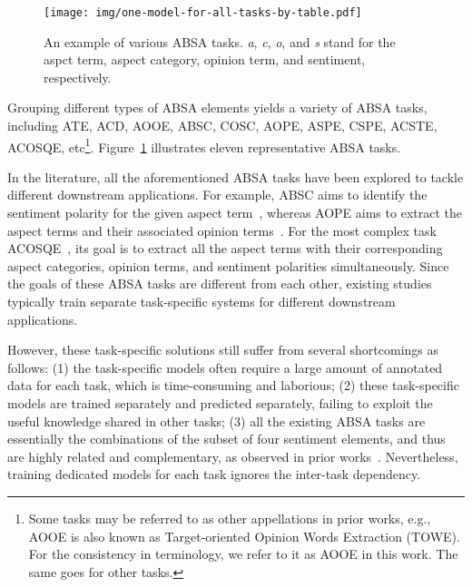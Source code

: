 \documentclass[11pt]{article}
\begin{document}
\begin{figure}[t]
\centering 
\texttt{[image: img/one-model-for-all-tasks-by-table.pdf]} 
\caption{An example of various ABSA tasks. \emph{a}, \emph{c}, \emph{o}, and \emph{s} stand for the aspct term, aspect category, opinion term, and sentiment, respectively.} 
\label{fig:various-absa-tasks-example}
\end{figure}


Grouping different types of ABSA elements yields a variety of ABSA tasks, including ATE, ACD, AOOE, ABSC, COSC, AOPE, ASPE, CSPE, ACSTE, ACOSQE, etc\footnote{Some tasks may be referred to as other appellations in prior works, e.g., AOOE is also known as Target-oriented Opinion Words Extraction (TOWE). For the consistency in terminology, we refer to it as AOOE in this work. The same goes for other tasks.}.
Figure~\ref{fig:various-absa-tasks-example} illustrates eleven representative ABSA tasks.

In the literature, all the aforementioned ABSA tasks have been explored to tackle different downstream applications.
For example, ABSC aims to identify the sentiment polarity for the given aspect term~\cite{tang2016effective}, whereas AOPE aims to extract the aspect terms and their associated opinion terms~\cite{chen-etal-2020-synchronous}.
For the most complex task ACOSQE~\cite{cai-etal-2021-acos}, its goal is to extract all the aspect terms with their corresponding aspect categories, opinion terms, and sentiment polarities simultaneously. 
Since the goals of these ABSA tasks are different from each other, existing studies typically train separate task-specific systems for different downstream applications.






However, these task-specific solutions still suffer from several shortcomings as follows: (1) the task-specific models often require a large amount of annotated data for each task, which is time-consuming and laborious; 
(2) these task-specific models are trained separately and predicted separately, failing to exploit the useful knowledge shared in other tasks; 
(3) all the existing ABSA tasks are essentially the combinations of the subset of four sentiment elements, and thus are highly related and complementary,
as observed in prior works~\citep{he-etal-2019-imn,chen-qian-2020-relation,yu-etal-2021-making}. Nevertheless, training dedicated models for each task ignores the inter-task dependency.
\end{document}
